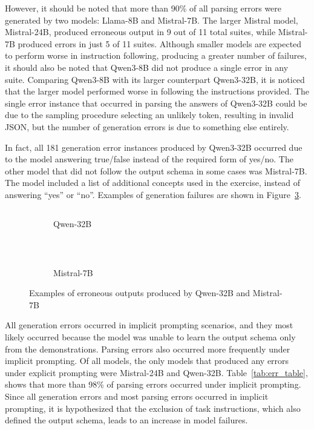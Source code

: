 \documentclass[english, 12pt, a4paper, sci, utf8, a-2b, online]{latex/definitions/aaltothesis}
\begin{document}


However, it should be noted that more than 90\% of all parsing errors were generated by two models: Llama-8B and Mistral-7B. The larger Mistral model, Mistral-24B, produced erroneous output in 9 out of 11 total suites, while Mistral-7B produced errors in just 5 of 11 suites. Although smaller models are expected to perform worse in instruction following, producing a greater number of failures, it should also be noted that Qwen3-8B did not produce a single error in any suite. Comparing Qwen3-8B with its larger counterpart Qwen3-32B, it is noticed that the larger model performed worse in following the instructions provided. The single error instance that occurred in parsing the answers of Qwen3-32B could be due to the sampling procedure selecting an unlikely token, resulting in invalid JSON, but the number of generation errors is due to something else entirely. 

In fact, all 181 generation error instances produced by Qwen3-32B occurred due to the model answering true/false instead of the required form of yes/no. The other model that did not follow the output schema in some cases was Mistral-7B. The model included a list of additional concepts used in the exercise, instead of answering ``yes'' or ``no''. Examples of generation failures are shown in Figure~\ref{fig:gen_error_examples}.

\begin{figure}[h]
    \centering
    \begin{subfigure}[b]{0.49\textwidth}
    \inputminted{json}{./minted_inputs/err_qwen32b.json}
    \caption{Qwen-32B}
    \label{fig:qwen_err}
    \end{subfigure}%
    ~ 
    \begin{subfigure}[b]{0.49\textwidth}
    \inputminted{json}{./minted_inputs/err_mistral7b.json}
    \caption{Mistral-7B}
    \label{fig:mistral_err}
    \end{subfigure}
    \caption{Examples of erroneous outputs produced by Qwen-32B and Mistral-7B}
    \label{fig:gen_error_examples}
\end{figure}

All generation errors occurred in implicit prompting scenarios, and they most likely occurred because the model was unable to learn the output schema only from the demonstrations. Parsing errors also occurred more frequently under implicit prompting. Of all models, the only models that produced any errors under explicit prompting were Mistral-24B and Qwen-32B. Table~\ref{tab:err_table}, shows that more than 98\% of parsing errors occurred under implicit prompting. Since all generation errors and most parsing errors occurred in implicit prompting, it is hypothesized that the exclusion of task instructions, which also defined the output schema, leads to an increase in model failures.
\end{document}
